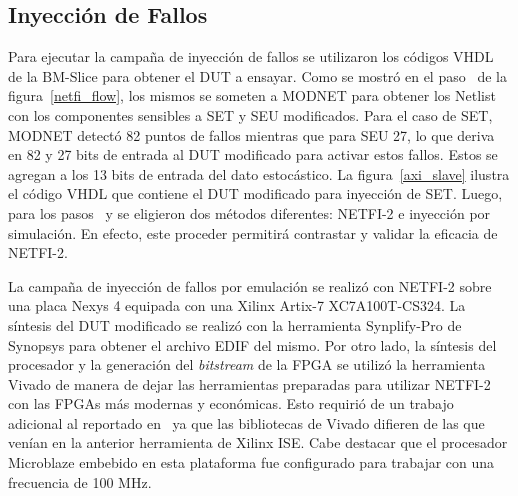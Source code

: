 \documentclass[a4paper,openright,12pt]{report}
\newcommand*\circled[1]{\tikz[baseline=(char.base)]{
            \node[shape=circle,draw,inner sep=0.7pt] (char) {#1};}}
\begin{document}
\subsection{Inyección de Fallos}

Para ejecutar la campaña de inyección de fallos se utilizaron los códigos VHDL de la BM-Slice para obtener el DUT a ensayar. Como se mostró en el paso~\circled{2} de la figura~\ref{netfi_flow}, los mismos se someten a MODNET para obtener los Netlist con los componentes sensibles a SET y SEU modificados. Para el caso de SET, MODNET detectó 82 puntos de fallos mientras que para SEU 27, lo que deriva en 82 y 27 bits de entrada al DUT modificado para activar estos fallos. Estos se agregan a los 13 bits de entrada del dato estocástico. La figura~\ref{axi_slave} ilustra el código VHDL que contiene el DUT modificado para inyección de SET. Luego, para los pasos~\circled{3} y \circled{4} se eligieron dos métodos diferentes: NETFI-2 e inyección por simulación. En efecto, este proceder permitirá contrastar y validar la eficacia de NETFI-2.

La campaña de inyección de fallos por emulación se realizó con NETFI-2 sobre una placa Nexys 4 equipada con una Xilinx Artix-7 XC7A100T-CS324. La síntesis del DUT modificado se realizó con la herramienta Synplify-Pro de Synopsys para obtener el archivo EDIF del mismo. Por otro lado, la síntesis del procesador y la generación del \textit{bitstream} de la FPGA se utilizó la herramienta Vivado de manera de dejar las herramientas preparadas para utilizar NETFI-2 con las FPGAs más modernas y económicas. Esto requirió de un trabajo adicional al reportado en~\cite{Mansour2013-1, Mansour2013-2} ya que las bibliotecas de Vivado difieren de las que venían en la anterior herramienta de Xilinx ISE. Cabe destacar que el procesador Microblaze embebido en esta plataforma fue configurado para trabajar con una frecuencia de 100 MHz.  
\end{document}

